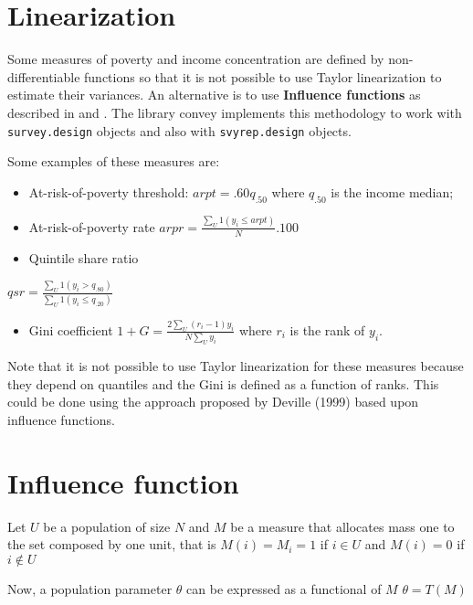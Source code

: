 \documentclass[]{book}
\providecommand{\tightlist}{%
  \setlength{\itemsep}{0pt}\setlength{\parskip}{0pt}}
\begin{document}
\section{Linearization}\label{linearization}

Some measures of poverty and income concentration are defined by
non-differentiable functions so that it is not possible to use Taylor
linearization to estimate their variances. An alternative is to use
\textbf{Influence functions} as described in \citep{deville1999} and
\citep{osier2009}. The library convey implements this methodology to
work with \texttt{survey.design} objects and also with
\texttt{svyrep.design} objects.

Some examples of these measures are:

\begin{itemize}
\item
  At-risk-of-poverty threshold: \(arpt=.60q_{.50}\) where \(q_{.50}\) is
  the income median;
\item
  At-risk-of-poverty rate \(arpr=\frac{\sum_U 1(y_i \leq arpt)}{N}.100\)
\item
  Quintile share ratio
\end{itemize}

\(qsr=\frac{\sum_U 1(y_i>q_{.80})}{\sum_U 1(y_i\leq q_{.20})}\)

\begin{itemize}
\tightlist
\item
  Gini coefficient \(1+G=\frac{2\sum_U (r_i-1)y_i}{N\sum_Uy_i}\) where
  \(r_i\) is the rank of \(y_i\).
\end{itemize}

Note that it is not possible to use Taylor linearization for these
measures because they depend on quantiles and the Gini is defined as a
function of ranks. This could be done using the approach proposed by
Deville (1999) based upon influence functions.

\section{Influence function}\label{influence-function}

Let \(U\) be a population of size \(N\) and \(M\) be a measure that
allocates mass one to the set composed by one unit, that is
\(M(i)=M_i= 1\) if \(i\in U\) and \(M(i)=0\) if \(i\notin U\)

Now, a population parameter \(\theta\) can be expressed as a functional
of \(M\) \(\theta=T(M)\)
\end{document}
